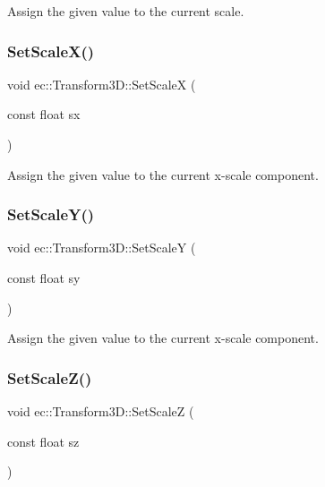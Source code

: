 Assign the given value to the current scale. \mbox{\label{classec_1_1_transform3_d_ae846994da07971f9d56b33d29cd65088}} 
\subsubsection{\texorpdfstring{Set\+Scale\+X()}{SetScaleX()}}
{\footnotesize\ttfamily void ec\+::\+Transform3\+D\+::\+Set\+ScaleX (\begin{DoxyParamCaption}\item[{const float}]{sx }\end{DoxyParamCaption})}

Assign the given value to the current x-\/scale component. \mbox{\label{classec_1_1_transform3_d_a2fc713c7032ef473b7c6cc73e323e54f}} 
\subsubsection{\texorpdfstring{Set\+Scale\+Y()}{SetScaleY()}}
{\footnotesize\ttfamily void ec\+::\+Transform3\+D\+::\+Set\+ScaleY (\begin{DoxyParamCaption}\item[{const float}]{sy }\end{DoxyParamCaption})}

Assign the given value to the current x-\/scale component. \mbox{\label{classec_1_1_transform3_d_a7e6dcd189fb5e4300e63a6eaeb20eece}} 
\subsubsection{\texorpdfstring{Set\+Scale\+Z()}{SetScaleZ()}}
{\footnotesize\ttfamily void ec\+::\+Transform3\+D\+::\+Set\+ScaleZ (\begin{DoxyParamCaption}\item[{const float}]{sz }\end{DoxyParamCaption})}

